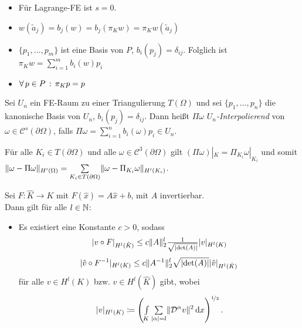 \documentclass{cheat-sheet}
\newcommand{\Cont}{\mathcal{C}} %
\newcommand{\bOmega}{\partial \Omega} %
\newcommand{\DO}{\mathcal{D}} %
\begin{document}
\begin{bem}
  \begin{itemize}
    \item Für Lagrange-FE ist $s = 0$.
    \item $w(\tilde{a}_j) = b_j(w) = b_j(\pi_K w) = \pi_K w(\tilde{a}_j)$
    \item $\{ p_1, \ldots, p_m \}$ ist eine Basis von $P$, \dh{} $b_i(p_j) = \delta_{ij}$. Folglich ist $\pi_K w = \sum_{i=1}^m b_i(w) p_i$
    \item $\forall \, {p \in P} \,:\, \pi_K p = p$
  \end{itemize}
\end{bem}


\begin{defn}
  Sei $U_n$ ein FE-Raum zu einer Triangulierung $T(\Omega)$ und sei $\{ p_1, \ldots, p_n \}$ die kanonische Basis von $U_n$, \dh{} $b_i(p_j) = \delta_{ij}$.
  Dann heißt $\Pi \omega$ \emph{$U_n$-Interpolierend} von $\omega \in \Cont^s(\bOmega)$, falls $\Pi \omega = \sum_{i=1}^n b_i(\omega) p_i \in U_n$.
\end{defn}

\begin{lem}
  Für alle $K_i \in T(\bOmega)$ und alle $\omega \in \Cont^3(\bOmega)$ gilt $(\Pi \omega) |_K = \Pi_{K_i} \omega|_{K_i}$ und somit $\norm{\omega - \Pi \omega}_{H'(\Omega)} = \sum_{K_i \in T(\bOmega)} \norm{\omega - \Pi_{K_i} \omega}_{H'(K_i)}$.
\end{lem}

\begin{lem}
  Sei $F : \hat{K} \to K$ mit $F(\hat{x}) = A \hat{x} + b$, mit $A$ invertierbar. \\
  Dann gilt für alle $l \in \mathbb{N}$:
  \begin{itemize}
    \item Es existiert eine Konstante $c > 0$, sodass
    \[
      \lvert v \circ F\rvert_{H^l(\hat{K})} \leq c \lVert A\rVert_2^l \tfrac{1}{\sqrt{\lvert\det(A)\rvert}} \lvert v\rvert_{H^l(K)}
    \]
    \[
      \lvert\hat{v} \circ F^{-1}\rvert_{H^l(K)} \leq c \lVert A^{-1}\rVert_2^l \sqrt{\lvert\det(A)\rvert} \lvert\hat{v}\rvert_{H^l(\hat{K})}
    \]
    für alle $v \in H^l(K)$ bzw. $\hat{v} \in H^l(\hat{K})$ gibt, wobei
    \[
      \abs{v}_{H^l(K)} \coloneqq \left( \Int{K}{}{\sum_{\abs{\alpha} = l} \norm{\DO^\alpha v}^2} {x}\right)^{\nicefrac{1}{2}}.
    \]
  \end{itemize}
\end{lem}
\end{document}
